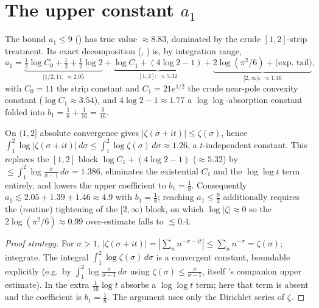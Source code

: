 \section{The upper constant \texorpdfstring{$a_1$}{a1}}
\label{sec:ls_upper}

The bound $a_1\le9$ () has true
value $\approx8.83$, dominated by the crude $[1,2]$-strip treatment. Its exact
decomposition (, )
is, by integration range,
\[
  a_1=\underbrace{\tfrac12\log C_0+\tfrac12+\tfrac12\log2}_{[1/2,1):\ \approx2.05}
     +\underbrace{\log C_1+(4\log2-1)}_{[1,2]:\ \approx5.32}
     +\underbrace{2\log(\pi^2/6)+\text{(exp.\ tail)}}_{[2,\infty):\ \approx1.46},
\]
with $C_0=11$ the strip constant and $C_1=21e^{1/2}$ the crude near-pole convexity
constant ($\log C_1\approx3.54$), and $4\log2-1\approx1.77$ a $\log\log$-absorption
constant folded into $b_1=\tfrac18+\tfrac1{16}=\tfrac3{16}$.

\begin{lemma}
\label{lem:ls_upper_elem}
\leanok
On $(1,2]$ absolute convergence gives $|\zeta(\sigma+it)|\le\zeta(\sigma)$, hence
$\int_1^2\log|\zeta(\sigma+it)|\,d\sigma\le\int_1^2\log\zeta(\sigma)\,d\sigma\approx1.26$,
a $t$-independent constant. This replaces the $[1,2]$ block $\log C_1+(4\log2-1)$
($\approx5.32$) by $\le\int_1^2\log\frac{\sigma}{\sigma-1}\,d\sigma=1.386$, eliminates
the existential $C_1$ and the $\log\log t$ term entirely, and lowers the upper
coefficient to $b_1=\tfrac18$. Consequently
$a_1\lesssim 2.05+1.39+1.46\approx4.9$ with $b_1=\tfrac18$; reaching
$a_1\le\tfrac92$ additionally requires the (routine) tightening of the $[2,\infty)$
block, on which $\log|\zeta|\approx0$ so the $2\log(\pi^2/6)\approx0.99$ over-estimate
falls to $\lesssim0.4$.
\end{lemma}

\begin{proof}[Proof strategy]
\leanok
For $\sigma>1$, $|\zeta(\sigma+it)|=|\sum_n n^{-\sigma-it}|\le\sum_n n^{-\sigma}
=\zeta(\sigma)$; integrate. The integral $\int_1^2\log\zeta(\sigma)\,d\sigma$ is a
convergent constant, boundable explicitly (e.g.\ by $\int_1^2\log\frac{\sigma}{\sigma-1}\,d\sigma$
using $\zeta(\sigma)\le\frac{\sigma}{\sigma-1}$, itself
's companion upper
estimate). In  the extra $\tfrac1{16}\log t$ absorbs a
$\log\log t$ term; here that term is absent and the coefficient is $b_1=\tfrac18$. The
argument uses only the Dirichlet series of $\zeta$.
\end{proof}

